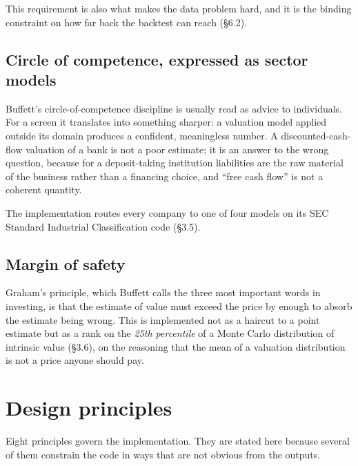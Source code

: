 \documentclass[11pt,a4paper]{article}
\begin{document}
This requirement is also what makes the data problem hard, and it is the
binding constraint on how far back the backtest can reach (\S6.2).

\subsection{Circle of competence, expressed as sector models}

Buffett's circle-of-competence discipline is usually read as advice to
individuals. For a screen it translates into something sharper: a valuation
model applied outside its domain produces a confident, meaningless number. A
discounted-cash-flow valuation of a bank is not a poor estimate; it is an
answer to the wrong question, because for a deposit-taking institution
liabilities are the raw material of the business rather than a financing
choice, and ``free cash flow'' is not a coherent quantity.

The implementation routes every company to one of four models on its SEC
Standard Industrial Classification code (\S3.5).

\subsection{Margin of safety}

Graham's principle, which Buffett calls the three most important words in
investing, is that the estimate of value must exceed the price by enough to
absorb the estimate being wrong. This is implemented not as a haircut to a
point estimate but as a rank on the \emph{25th percentile} of a Monte Carlo
distribution of intrinsic value (\S3.6), on the reasoning that the mean of a
valuation distribution is not a price anyone should pay.

\section{Design principles}

Eight principles govern the implementation. They are stated here because
several of them constrain the code in ways that are not obvious from the
outputs.
\end{document}
